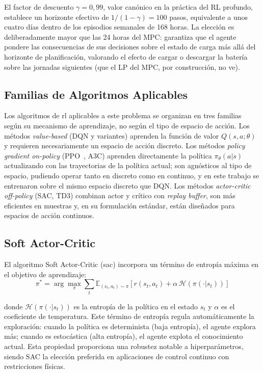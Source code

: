 \documentclass[12pt, a4paper, twoside]{report}
\begin{document}
El factor de descuento $\gamma = 0{,}99$, valor canónico en la práctica del RL
profundo, establece un horizonte efectivo de $1/(1-\gamma) = 100$ pasos,
equivalente a unos cuatro días dentro de los episodios semanales de 168 horas.
La elección es deliberadamente mayor que las 24 horas del MPC: garantiza que
el agente pondere las consecuencias de sus decisiones sobre el estado de carga
más allá del horizonte de planificación, valorando el efecto de cargar o
descargar la batería sobre las jornadas siguientes (que el LP del MPC, por
construcción, no ve).

\subsection{Familias de Algoritmos Aplicables}

Los algoritmos de \acrshort{rl} aplicables a este problema se organizan en tres
familias según su mecanismo de aprendizaje, no según el tipo de espacio de
acción. Los métodos \textit{value-based} (DQN y variantes) aprenden la función
de valor $Q(s,a;\theta)$ y requieren necesariamente un espacio de acción
discreto. Los métodos \textit{policy gradient on-policy} (PPO~\citep{Schulman2017}, A3C)
aprenden
directamente la política $\pi_\theta(a|s)$ actualizando con las trayectorias de
la política actual; son agnósticos al tipo de espacio, pudiendo operar tanto en
discreto como en continuo, y en este trabajo se entrenaron sobre el mismo
espacio discreto que DQN. Los métodos \textit{actor-critic off-policy} (SAC,
TD3) combinan actor y crítico con \textit{replay buffer}, son más eficientes en
muestras y, en su formulación estándar, están diseñados para espacios de acción
continuos.

\subsection{Soft Actor-Critic}

El algoritmo Soft Actor-Critic (\acrshort{sac}) \citep{Haarnoja2018} incorpora un
término de entropía
máxima en el objetivo de aprendizaje:
\begin{equation}
  \pi^* = \arg\max_\pi \sum_t \mathbb{E}_{(s_t,a_t)\sim\pi}\!\left[
    r(s_t,a_t) + \alpha\,\mathcal{H}(\pi(\cdot|s_t))
  \right]
  \label{eq:sac_objetivo}
\end{equation}

donde $\mathcal{H}(\pi(\cdot|s_t))$ es la entropía de la política en el estado
$s_t$ y $\alpha$ es el coeficiente de temperatura. Este término de entropía
regula automáticamente la exploración: cuando la política es determinista
(baja entropía), el agente explora más; cuando es estocástica (alta entropía),
el agente explota el conocimiento actual. Esta propiedad proporciona una
robustez notable a hiperparámetros, siendo SAC la elección preferida en
aplicaciones de control continuo con restricciones físicas.
\end{document}
